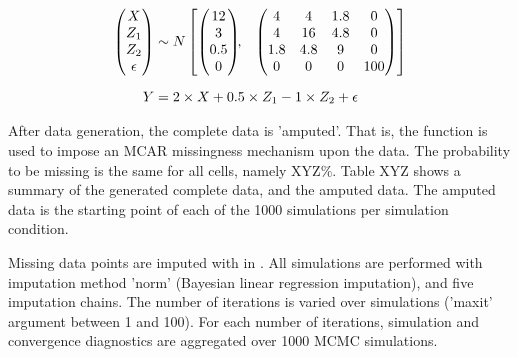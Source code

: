 \documentclass[article]{jss}
\newcommand{\fct}[1]{\code{#1()}}
\begin{document}
\begin{align*}
\begin{pmatrix}X\\
Z_{1}\\
Z_{2}\\
\epsilon
\end{pmatrix} &\sim  N
\begin{bmatrix}
\begin{pmatrix}
12\\
3\\
0.5\\
0
\end{pmatrix}\!\!,&
\begin{pmatrix}
4 & 4 & 1.8 & 0\\
4 & 16 & 4.8 & 0\\
1.8 & 4.8 & 9 & 0\\
0 & 0 & 0 & 100
\end{pmatrix}
\end{bmatrix}\\[2\jot]
Y &=  2 \times X + 0.5 \times Z_1 - 1 \times Z_2 + \epsilon
\end{align*}

After data generation, the complete data is 'amputed'. That is, the  function \fct{ampute} is used to impose an MCAR missingness mechanism upon the data. The probability to be missing is the same for all cells, namely XYZ\%. %
Table XYZ shows a summary of the generated complete data, and the amputed data. The amputed data is the starting point of each of the 1000 simulations per simulation condition.

Missing data points are imputed with  in . All simulations are performed with imputation method 'norm' (Bayesian linear regression imputation), and five imputation chains. The number of iterations is varied over simulations ('maxit' argument between 1 and 100). For each number of iterations, simulation and convergence diagnostics are aggregated over 1000 MCMC simulations. 
\end{document}
